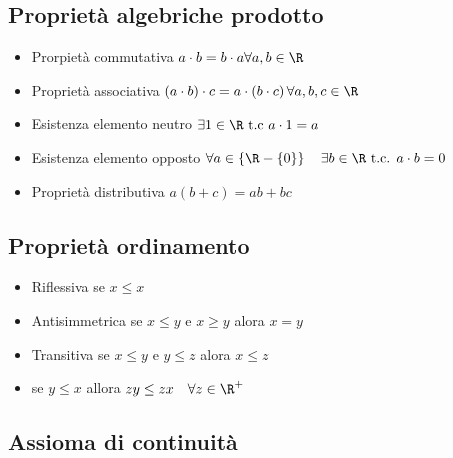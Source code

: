 \subsection{Proprietà algebriche prodotto}
\label{sec:proprietàalgebricheprodotto}
\begin{itemize}
	\item Prorpietà commutativa $a \cdot b = b\cdot a \forall a,b  \in  \R$
	\item Proprietà associativa $\left( a\cdot b \right) \cdot c = a \cdot \left( b\cdot c \right) \forall a,b,c  \in  \R$
	\item Esistenza elemento neutro $\exists 1  \in \R \text{ t.c } a\cdot 1=a$
	\item Esistenza elemento opposto $\forall a  \in \left\{ \R-\left\{ 0 \right\}  \right\}  \quad \exists b  \in  \R \text{ t.c. } a\cdot b=0$
	\item Proprietà  distributiva $a\left( b+c \right) = ab+bc$
\end{itemize}
\subsection{Proprietà ordinamento}
\label{sub:proprietàordinamento}
\begin{itemize}
	\item Riflessiva se $x\le x$
	\item Antisimmetrica se $x \le y$ e $x \ge y$ alora $x=y$
	\item Transitiva se $x \le y$ e $y \le z$ alora $x\le z$
	\item se $y \le x$ allora  $zy \le zx \quad \forall z  \in \R^{+}$
\end{itemize}
\subsection{Assioma di continuità}
\label{sub:assiomadicontinuità}\phantom{.}

